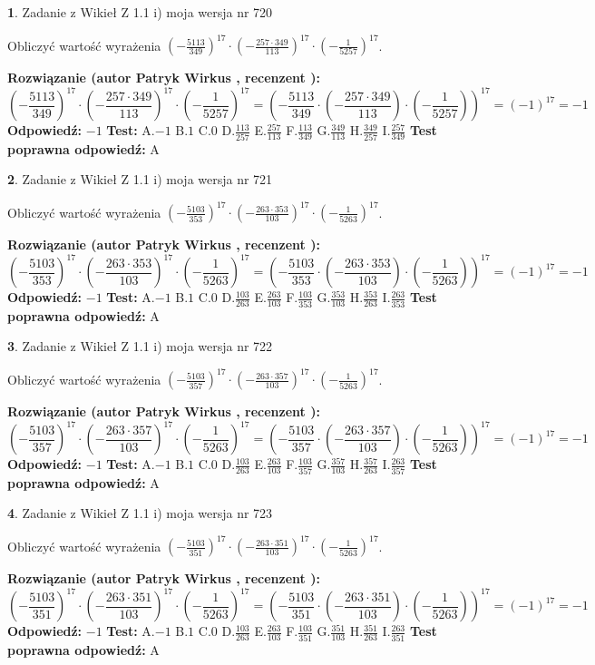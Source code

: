\documentclass[12pt, a4paper]{article}
\theoremstyle{definition} %
\newtheorem{zad}{}
\newcommand{\zadStart}[1]{\begin{zad}#1\newline}
\newcommand{\zadStop}{\end{zad}}
\newcommand{\rozwStart}[2]{\noindent \textbf{Rozwiązanie (autor #1 , recenzent #2): }\newline}
\newcommand{\rozwStop}{\newline}
\newcommand{\odpStart}{\noindent \textbf{Odpowiedź:}\newline}
\newcommand{\odpStop}{\newline}
\newcommand{\testStart}{\noindent \textbf{Test:}\newline}
\newcommand{\testStop}{\newline}
\newcommand{\kluczStart}{\noindent \textbf{Test poprawna odpowiedź:}\newline}
\newcommand{\kluczStop}{\newline}
\begin{document}
\zadStart{Zadanie z Wikieł Z 1.1 i) moja wersja nr 720}

Obliczyć wartość wyrażenia $(-\frac{5113}{349})^{17} \cdot (-\frac{257 \cdot 349}{113})^{17} \cdot (-\frac{1}{5257})^{17}$.
\zadStop
\rozwStart{Patryk Wirkus}{}
$$(-\frac{5113}{349})^{17} \cdot (-\frac{257 \cdot 349}{113})^{17} \cdot (-\frac{1}{5257})^{17} = (-\frac{5113}{349} \cdot (-\frac{257 \cdot 349}{113}) \cdot (-\frac{1}{5257}))^{17} = (-1)^{17} = -1$$
\rozwStop
\odpStart
$-1$
\odpStop
\testStart
A.$-1$ B.$1$ C.$0$ D.$\frac{113}{257}$ E.$\frac{257}{113}$
F.$\frac{113}{349}$ G.$\frac{349}{113}$
H.$\frac{349}{257}$
I.$\frac{257}{349}$
\testStop
\kluczStart
A
\kluczStop



\zadStart{Zadanie z Wikieł Z 1.1 i) moja wersja nr 721}

Obliczyć wartość wyrażenia $(-\frac{5103}{353})^{17} \cdot (-\frac{263 \cdot 353}{103})^{17} \cdot (-\frac{1}{5263})^{17}$.
\zadStop
\rozwStart{Patryk Wirkus}{}
$$(-\frac{5103}{353})^{17} \cdot (-\frac{263 \cdot 353}{103})^{17} \cdot (-\frac{1}{5263})^{17} = (-\frac{5103}{353} \cdot (-\frac{263 \cdot 353}{103}) \cdot (-\frac{1}{5263}))^{17} = (-1)^{17} = -1$$
\rozwStop
\odpStart
$-1$
\odpStop
\testStart
A.$-1$ B.$1$ C.$0$ D.$\frac{103}{263}$ E.$\frac{263}{103}$
F.$\frac{103}{353}$ G.$\frac{353}{103}$
H.$\frac{353}{263}$
I.$\frac{263}{353}$
\testStop
\kluczStart
A
\kluczStop



\zadStart{Zadanie z Wikieł Z 1.1 i) moja wersja nr 722}

Obliczyć wartość wyrażenia $(-\frac{5103}{357})^{17} \cdot (-\frac{263 \cdot 357}{103})^{17} \cdot (-\frac{1}{5263})^{17}$.
\zadStop
\rozwStart{Patryk Wirkus}{}
$$(-\frac{5103}{357})^{17} \cdot (-\frac{263 \cdot 357}{103})^{17} \cdot (-\frac{1}{5263})^{17} = (-\frac{5103}{357} \cdot (-\frac{263 \cdot 357}{103}) \cdot (-\frac{1}{5263}))^{17} = (-1)^{17} = -1$$
\rozwStop
\odpStart
$-1$
\odpStop
\testStart
A.$-1$ B.$1$ C.$0$ D.$\frac{103}{263}$ E.$\frac{263}{103}$
F.$\frac{103}{357}$ G.$\frac{357}{103}$
H.$\frac{357}{263}$
I.$\frac{263}{357}$
\testStop
\kluczStart
A
\kluczStop



\zadStart{Zadanie z Wikieł Z 1.1 i) moja wersja nr 723}

Obliczyć wartość wyrażenia $(-\frac{5103}{351})^{17} \cdot (-\frac{263 \cdot 351}{103})^{17} \cdot (-\frac{1}{5263})^{17}$.
\zadStop
\rozwStart{Patryk Wirkus}{}
$$(-\frac{5103}{351})^{17} \cdot (-\frac{263 \cdot 351}{103})^{17} \cdot (-\frac{1}{5263})^{17} = (-\frac{5103}{351} \cdot (-\frac{263 \cdot 351}{103}) \cdot (-\frac{1}{5263}))^{17} = (-1)^{17} = -1$$
\rozwStop
\odpStart
$-1$
\odpStop
\testStart
A.$-1$ B.$1$ C.$0$ D.$\frac{103}{263}$ E.$\frac{263}{103}$
F.$\frac{103}{351}$ G.$\frac{351}{103}$
H.$\frac{351}{263}$
I.$\frac{263}{351}$
\testStop
\kluczStart
A
\kluczStop
\end{document}
